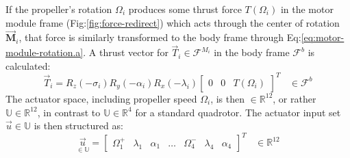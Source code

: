 \par
If the propeller's rotation $\Omega_i$ produces some thrust force $T(\Omega_i)$ in the motor module frame (Fig:\ref{fig:force-redirect}) which acts through the center of rotation $\vec{\mathbf{M}}_i$, that force is similarly transformed to the body frame through Eq:\ref{eq:motor-module-rotation.a}. A thrust vector for $\vec{T}_i\in\mathcal{F}^{M_i}$ in the body frame $\mathcal{F}^b$ is calculated:
\begin{equation}\label{eq:motor-module-force-redirect}
\vec{T}_i=R_z(-\sigma_i)R_y(-\alpha_i)R_x(-\lambda_i)\begin{bmatrix}0 & 0 & T(\Omega_i)\end{bmatrix}^T~~~~\in\mathcal{F}^{b}
\end{equation}
The actuator space, including propeller speed $\Omega_i$, is then $\in\mathbb{R}^{12}$, or rather $\mathbb{U}\in\mathbb{R}^{12}$, in contrast to $\mathbb{U}\in\mathbb{R}^4$ for a standard quadrotor. The actuator input set $\vec{u} \in \mathbb{U}$ is then structured as:
\begin{equation}\label{eq:actuator-space}
\underset{\in\mathbb{U}}{\vec{u}}=\begin{bmatrix}
\Omega_1^+ & \lambda_1 & \alpha_1 & \ldots & \Omega_4^- & \lambda_4 & \alpha_4
\end{bmatrix}^T~~~~\in\mathbb{R}^{12}
\end{equation}
\newpage
